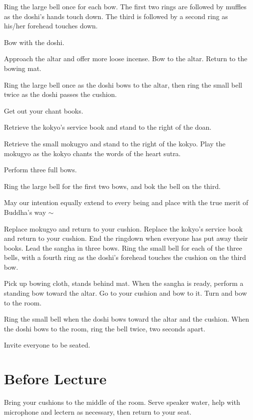\documentclass{kdo}
\begin{document}
\begin{services}
\doan Ring the large bell once for each bow. The first two rings are followed
by muffles as the doshi's hands touch down. The third is followed by a second
ring as his/her forehead touches down.
\firstBows

\sangha Bow with the doshi.

\doshi Approach the altar and offer more loose incense. Bow to the altar.
Return to the bowing mat.

\doan Ring the large bell once as the doshi bows to the altar, then ring the
small bell twice as the doshi passes the cushion.
\takeOutChantBookBells

\sangha Get out your chant books.

\kokyo Retrieve the kokyo's service book and stand to the right of the doan.

\tenken Retrieve the small mokugyo and stand to the right of the kokyo. Play the
mokugyo as the kokyo chants the words of the heart sutra.

\doshi Perform three full bows.

\doan Ring the large bell for the first two bows, and bok the bell on the
third.
\secondBows

\kokyo \heartOfGreatPerfectWisdomSutra

\kokyo May our intention equally extend to every being and place with the true
merit of Buddha's way $\sim$ \largebell

\allBuddhas*

\smallBellRolldown

\tenken Replace mokugyo and return to your cushion.
\kokyo Replace the kokyo's service book and return to your cushion.
\doan End the ringdown when everyone has put away their books.
\doshi Lead the sangha in three bows.
\doan Ring the small bell for each of the three bells, with a fourth ring as
the doshi's forehead touches the cushion on the third bow.
\lastBows

\doshi Pick up bowing cloth, stands behind mat. When the sangha is ready,
perform a standing bow toward the altar. Go to your cushion and bow to it. Turn
and bow to the room.

\doan Ring the small bell when the doshi bows toward the altar and the cushion.
When the doshi bows to the room, ring the bell twice, two seconds apart.
\beSeatedBells

\doshi Invite everyone to be seated.

\section*{Before Lecture}
\sangha Bring your cushions to the middle of the room.
\kokyo Serve speaker water, help with microphone and lectern as necessary,
then return to your seat.


\end{services}
\end{document}

